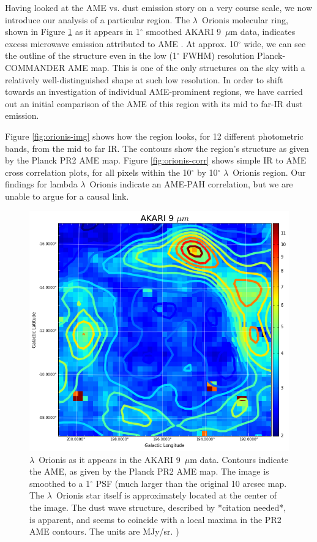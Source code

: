 \documentclass[preprint2,longabstract]{aastex}
\begin{document}
	Having looked at the AME vs. dust emission story on a very course scale, we now introduce our analysis of a particular region. The $\lambda$~Orionis molecular ring, shown in Figure \ref{fig:orionis-akari9} as it appears in 1$^{\circ}$ smoothed AKARI 9~$\mu$m data, indicates excess microwave emission attributed to AME \citep{planck15XXV}. At approx. 10$^{\circ}$ wide, we can see the outline of the structure even in the low (1$^{\circ}$ FWHM) resolution Planck-COMMANDER AME map. This is one of the only structures on the sky with a relatively well-distinguished shape at such low resolution. In order to shift towards an investigation of individual AME-prominent regions, we have carried out an initial comparison of the AME of this region with its mid to far-IR dust emission.

	Figure \ref{fig:orionis-img} shows how the region looks, for 12 different photometric bands, from the mid to far IR. The contours show the region's structure as given by the Planck PR2 AME map. Figure \ref{fig:orionis-corr} shows simple IR to AME cross correlation plots, for all pixels within the 10$^{\circ}$ by 10$^{\circ}$ $\lambda$~Orionis region. Our findings for lambda $\lambda$~Orionis indicate an AME-PAH correlation, but we are unable to argue for a causal link.

\begin{figure}
  \label{fig:orionis-akari9}
  \includegraphics[width=150mm]{../Plots/lOrionis_AKARI9.png}
  \centering
  \caption{$\lambda$~Orionis as it appears in the AKARI 9~$\mu$m data. Contours indicate the AME, as given by the Planck PR2 AME map. The image is smoothed to a 1$^{\circ}$ PSF (much larger than the original 10 arcsec map. The $\lambda$~Orionis star itself is approximately located at the center of the image. The dust wave structure, described by *citation needed*, is apparent, and seems to coincide with a local maxima in the PR2 AME contours. The units are MJy/sr. )}
\end{figure}
\end{document}
